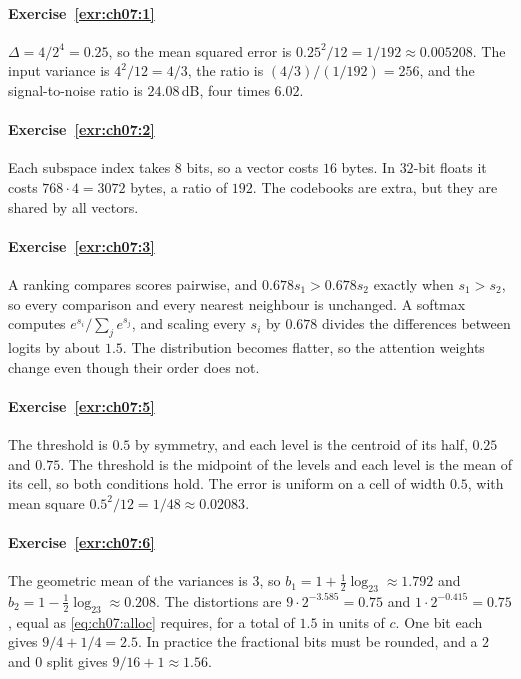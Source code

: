
\paragraph{Exercise~\ref{exr:ch07:1}}
$\Delta=4/2^4=0.25$, so the mean squared error is $0.25^2/12=1/192\approx0.005208$. The input variance is $4^2/12=4/3$, the ratio is $(4/3)/(1/192)=256$, and the signal-to-noise ratio is $24.08$\,dB, four times $6.02$.

\paragraph{Exercise~\ref{exr:ch07:2}}
Each subspace index takes $8$ bits, so a vector costs $16$ bytes. In $32$-bit floats it costs $768\cdot4=3072$ bytes, a ratio of $192$. The codebooks are extra, but they are shared by all vectors.

\paragraph{Exercise~\ref{exr:ch07:3}}
A ranking compares scores pairwise, and $0.678s_1>0.678s_2$ exactly when $s_1>s_2$, so every comparison and every nearest neighbour is unchanged. A softmax computes $e^{s_i}/\sum_je^{s_j}$, and scaling every $s_i$ by $0.678$ divides the differences between logits by about $1.5$. The distribution becomes flatter, so the attention weights change even though their order does not.

\paragraph{Exercise~\ref{exr:ch07:5}}
The threshold is $0.5$ by symmetry, and each level is the centroid of its half, $0.25$ and $0.75$. The threshold is the midpoint of the levels and each level is the mean of its cell, so both conditions hold. The error is uniform on a cell of width $0.5$, with mean square $0.5^2/12=1/48\approx0.02083$.

\paragraph{Exercise~\ref{exr:ch07:6}}
The geometric mean of the variances is $3$, so $b_1=1+\tfrac12\log_23\approx1.792$ and $b_2=1-\tfrac12\log_23\approx0.208$. The distortions are $9\cdot2^{-3.585}=0.75$ and $1\cdot2^{-0.415}=0.75$, equal as \cref{eq:ch07:alloc} requires, for a total of $1.5$ in units of $c$. One bit each gives $9/4+1/4=2.5$. In practice the fractional bits must be rounded, and a $2$ and $0$ split gives $9/16+1\approx1.56$.

